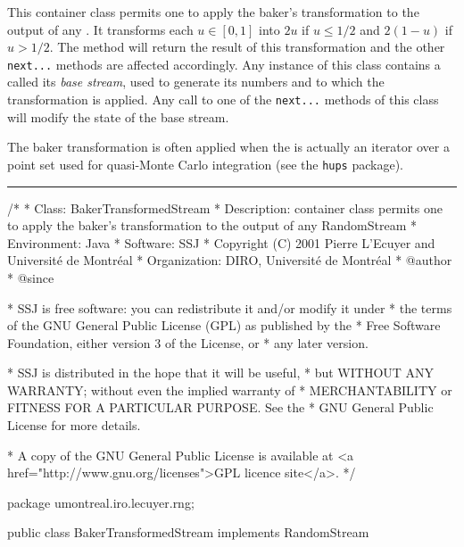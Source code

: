 
This container class permits one to apply the baker's transformation to
the output of any .  
It transforms each $u \in [0,1]$ into $2u$ if $u \le 1/2$ and $2(1-u)$
if $u > 1/2$.
The  method will return the result of this transformation
and the other \texttt{next...} methods are affected accordingly.
Any instance of this class contains a  called its
\emph{base stream}, used to generate its numbers and to which the
transformation is applied. 
Any call to one of the \texttt{next...}
methods of this class will modify the state of the base stream. 

The baker transformation is often applied when the 
is actually an iterator over a point set used for quasi-Monte Carlo
integration (see the \texttt{hups} package).


\bigskip\hrule

\begin{code}
\begin{hide}
/*
 * Class:        BakerTransformedStream
 * Description:  container class permits one to apply the baker's 
                 transformation to the output of any RandomStream
 * Environment:  Java
 * Software:     SSJ 
 * Copyright (C) 2001  Pierre L'Ecuyer and Université de Montréal
 * Organization: DIRO, Université de Montréal
 * @author       
 * @since

 * SSJ is free software: you can redistribute it and/or modify it under
 * the terms of the GNU General Public License (GPL) as published by the
 * Free Software Foundation, either version 3 of the License, or
 * any later version.

 * SSJ is distributed in the hope that it will be useful,
 * but WITHOUT ANY WARRANTY; without even the implied warranty of
 * MERCHANTABILITY or FITNESS FOR A PARTICULAR PURPOSE.  See the
 * GNU General Public License for more details.

 * A copy of the GNU General Public License is available at
   <a href="http://www.gnu.org/licenses">GPL licence site</a>.
 */
\end{hide}
package umontreal.iro.lecuyer.rng; 

public class BakerTransformedStream implements RandomStream \begin{hide} {

   // The base stream.
   private RandomStream st;

\end{hide}
\end{code}

